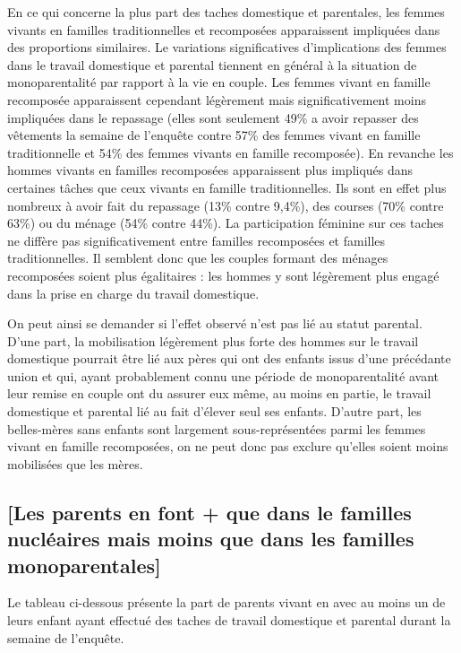 \documentclass[
  12pt,
]{book}
\begin{document}
En ce qui concerne la plus part des taches domestique et parentales, les
femmes vivants en familles traditionnelles et recomposées apparaissent
impliquées dans des proportions similaires. Le variations significatives
d'implications des femmes dans le travail domestique et parental
tiennent en général à la situation de monoparentalité par rapport à la
vie en couple. Les femmes vivant en famille recomposée apparaissent
cependant légèrement mais significativement moins impliquées dans le
repassage (elles sont seulement 49\% a avoir repasser des vêtements la
semaine de l'enquête contre 57\% des femmes vivant en famille
traditionnelle et 54\% des femmes vivants en famille recomposée). En
revanche les hommes vivants en familles recomposées apparaissent plus
impliqués dans certaines tâches que ceux vivants en famille
traditionnelles. Ils sont en effet plus nombreux à avoir fait du
repassage (13\% contre 9,4\%), des courses (70\% contre 63\%) ou du
ménage (54\% contre 44\%). La participation féminine sur ces taches ne
diffère pas significativement entre familles recomposées et familles
traditionnelles. Il semblent donc que les couples formant des ménages
recomposées soient plus égalitaires : les hommes y sont légèrement plus
engagé dans la prise en charge du travail domestique.

On peut ainsi se demander si l'effet observé n'est pas lié au statut
parental. D'une part, la mobilisation légèrement plus forte des hommes
sur le travail domestique pourrait être lié aux pères qui ont des
enfants issus d'une précédante union et qui, ayant probablement connu
une période de monoparentalité avant leur remise en couple ont du
assurer eux même, au moins en partie, le travail domestique et parental
lié au fait d'élever seul ses enfants. D'autre part, les belles-mères
sans enfants sont largement sous-représentées parmi les femmes vivant en
famille recomposées, on ne peut donc pas exclure qu'elles soient moins
mobilisées que les mères.

\subsection{{[}Les parents en font + que dans le familles nucléaires
mais moins que dans les familles
monoparentales{]}}\label{les-parents-en-font-que-dans-le-familles-nucluxe9aires-mais-moins-que-dans-les-familles-monoparentales}

Le tableau ci-dessous présente la part de parents vivant en avec au
moins un de leurs enfant ayant effectué des taches de travail domestique
et parental durant la semaine de l'enquête.
\end{document}
